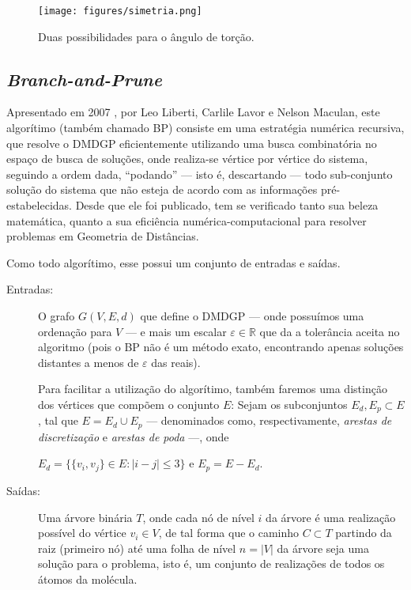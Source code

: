 \begin{figure}[H]
	\begin{center}
		\texttt{[image: figures/simetria.png]}
	\end{center}
	\caption{Duas possibilidades para o ângulo de torção.}
	\label{fig:torcao}
\end{figure}

\subsection{\textit{Branch-and-Prune} \label{sec:bp}}

Apresentado em 2007 \cite{carlile:BP}, por Leo Liberti, Carlile Lavor e Nelson Maculan, este algorítimo (também chamado BP) consiste em uma estratégia numérica recursiva, que resolve o DMDGP eficientemente utilizando uma busca combinatória no espaço de busca de soluções, onde realiza-se vértice por vértice do sistema, seguindo a ordem dada, ``podando'' --- isto é, descartando --- todo sub-conjunto solução do sistema que não esteja de acordo com as informações pré-estabelecidas. Desde que ele foi publicado, tem se verificado tanto sua beleza matemática, quanto a sua eficiência numérica-computacional para resolver problemas em Geometria de Distâncias.

Como todo algorítimo, esse possui um conjunto de entradas e saídas.
\begin{description}
	\item[Entradas:] O grafo $G(V, E, d)$ que define o DMDGP --- onde possuímos uma ordenação para $V$ --- e mais um escalar $\varepsilon \in \mathbb{R}$ que da a tolerância aceita no algoritmo (pois o BP não é um método exato, encontrando apenas soluções distantes a menos de $\varepsilon$ das reais).
	
	Para facilitar a utilização do algorítimo, também faremos uma distinção dos vértices que compõem o conjunto $E$: Sejam os subconjuntos $E_{d}, E_p \subset E$, tal que $E = E_{d} \cup E_{p}$ --- denominados como, respectivamente, \textit{arestas de discretização} e \textit{arestas de poda} ---, onde
	
	\begin{center}
		$E_{d} = \{\{v_i,v_j\} \in E : |i-j|\leq 3\}$ e $E_{p} = E - E_d$.
	\end{center}
	
	\item[Saídas:] Uma árvore binária $T$, onde cada nó de nível $i$ da árvore é uma realização possível do vértice $v_i \in V$, de tal forma que o caminho $C \subset T$ partindo da raiz (primeiro nó) até uma folha de nível $n = |V|$ da árvore seja uma solução para o problema, isto é, um conjunto de realizações de todos os átomos da molécula.
\end{description}

